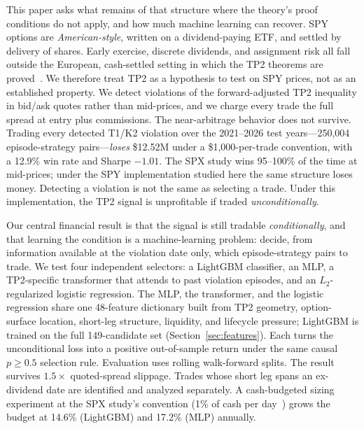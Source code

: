 \documentclass[sigconf,review]{acmart}
\begin{document}
This paper asks what remains of that structure where the theory's proof conditions do not apply, and how much machine learning can recover. SPY options are \emph{American-style}, written on a dividend-paying ETF, and settled by delivery of shares. Early exercise, discrete dividends, and assignment risk all fall outside the European, cash-settled setting in which the TP2 theorems are proved~\cite{glasserman2026tp2theory,cosma2020earlyexercise}. We therefore treat TP2 as a hypothesis to test on SPY prices, not as an established property. We detect violations of the forward-adjusted TP2 inequality in bid/ask quotes rather than mid-prices, and we charge every trade the full spread at entry plus commissions. The near-arbitrage behavior does not survive. Trading every detected T1/K2 violation over the 2021--2026 test years---250{,}004 episode-strategy pairs---\emph{loses} \$12.52M under a \$1{,}000-per-trade convention, with a 12.9\% win rate and Sharpe $-1.01$. The SPX study wins 95--100\% of the time at mid-prices; under the SPY implementation studied here the same structure loses money. Detecting a violation is not the same as selecting a trade. Under this implementation, the TP2 signal is unprofitable if traded \emph{unconditionally}.

Our central financial result is that the signal is still tradable \emph{conditionally}, and that learning the condition is a machine-learning problem: decide, from information available at the violation date only, which episode-strategy pairs to trade. We test four independent selectors: a LightGBM classifier, an MLP, a TP2-specific transformer that attends to past violation episodes, and an $L_2$-regularized logistic regression. The MLP, the transformer, and the logistic regression share one 48-feature dictionary built from TP2 geometry, option-surface location, short-leg structure, liquidity, and lifecycle pressure; LightGBM is trained on the full 149-candidate set (Section~\ref{sec:features}). Each turns the unconditional loss into a positive out-of-sample return under the same causal $p\ge0.5$ selection rule. Evaluation uses rolling walk-forward splits. The result survives $1.5\times$ quoted-spread slippage. Trades whose short leg spans an ex-dividend date are identified and analyzed separately. A cash-budgeted sizing experiment at the SPX study's convention (1\% of cash per day~\cite{glasserman2025tp2}) grows the budget at 14.6\% (LightGBM) and 17.2\% (MLP) annually.
\end{document}
